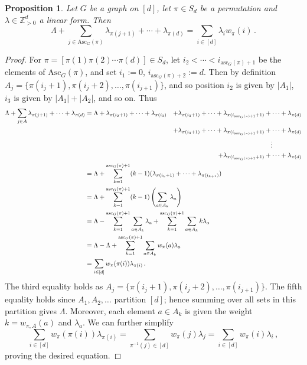 \documentclass[11pt]{amsart}
\newtheorem{proposition}[theorem]{Proposition}
\newcommand{\asc}{\mathrm{Asc}}
\newcommand{\ascnum}{\mathrm{asc}}
\begin{document}
\begin{proposition}\label{prop:weightedcolorsum}
    Let $G$ be a graph on $[d]$, let $\pi \in S_d$ be a permutation and  $\lambda \in \mathbb{Z}_{>0}^d$ a linear
form. Then
    \[
        \Lambda + \sum_{j \in \asc_G(\pi)} \lambda_{\pi(j+1)} + \cdots + \lambda_{\pi(d)} = \sum_{i \in [d]}
\lambda_i w_{\pi}(i) \, .
    \]
\end{proposition}
\begin{proof}
    For $\pi = [\pi(1) \pi(2) \cdots \pi(d)] \in S_d$, let $i_2 < \cdots < i_{\ascnum_G(\pi)+1}$ be the elements
of $\asc_G(\pi)$, and set $i_1 := 0$, $i_{\ascnum_G(\pi)+2}:=d$. Then by definition $A_j=\{\pi({i_j +1}),
\pi({i_j +2}), \ldots, \pi({i_{j+1}})\}$, and so position $i_2$ is given by $|A_1|$, $i_3$ is given by $|A_1| +
|A_2|$, and so on. Thus 
    \begin{alignat*}{2}
        \Lambda + \sum_{j \in A} \lambda_{\pi(j+1)} + \cdots + \lambda_{\pi(d)} &= \Lambda + \lambda_{\pi(i_2 +1)} + \cdots + \lambda_{\pi(i_3)}&+ \lambda_{\pi(i_3+1)}+\cdots + \lambda_{\pi(i_{\ascnum_G(\pi) +1 } +1 )} + \cdots + \lambda_{\pi(d)} \\
        & &+\lambda_{\pi(i_3+1)}+\cdots + \lambda_{\pi(i_{\ascnum_G(\pi)+1 } +1 )} + \cdots + \lambda_{\pi(d)}\\
        & &\vdots \hspace{4.5em}\\
        & &+ \lambda_{\pi(i_{\ascnum_G(\pi)+1 } +1 )} + \cdots + \lambda_{\pi(d)} \\
        &= \Lambda + \sum_{k = 1}^{\ascnum_G(\pi)+1} (k-1) (\lambda_{\pi(i_k +1)} + \cdots + \lambda_{\pi(i_{k+1})}) \hspace{-10em} \\
        &= \Lambda + \sum_{k = 1}^{\ascnum_G(\pi)+1} (k-1) \left( \sum_{a \in A_k} \lambda_a \right)\hspace{-10em} \\
        &= \Lambda - \sum_{k = 1}^{\ascnum_G(\pi)+1} \sum_{a \in A_k} \lambda_a +  \sum_{k = 1}^{\ascnum_G(\pi)+1}  \sum_{a \in A_k} k \lambda_a \hspace{-10em} \\
        &= \Lambda - \Lambda + \sum_{k = 1}^{\ascnum_G(\pi)+1}  \sum_{a \in A_k} w_\pi(a) \lambda_a \hspace{-10em} \\
        &=  \sum_{i \in [d]} w_{\pi}(\pi(i)) \lambda_{\pi(i)} \, .
    \end{alignat*}
    The third equality holds as $A_j=\{\pi({i_j +1}), \pi({i_j +2}), \ldots, \pi({i_{j+1}})\}$. 
    The fifth equality holds since $A_1,A_2,\ldots$ partition $[d]$; hence summing over all sets in this
partition gives $\Lambda$. 
    Moreover, each element $a \in A_k$ is given the weight $k = w_{\pi,A}(a)$ and $\lambda_{a}$. 
    We can further simplify \[ \sum_{i \in [d]} w_{\pi}(\pi(i)) \lambda_{\pi(i)} = \sum_{\pi^{-1}(j) \in [d]} w_{\pi}(j) \lambda_{j} = \sum_{i \in [d]} w_\pi(i)
\lambda_i \, , \] proving the desired equation. 
\end{proof}
\end{document}
